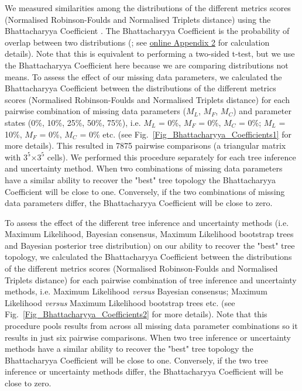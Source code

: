 \documentclass[12pt,letterpaper]{article}
\begin{document}
We measured similarities among the distributions of the different metrics scores (Normalised Robinson-Foulds and Normalised Triplets distance) using the Bhattacharyya Coefficient \citep{Bhattacharyya}. The Bhattacharyya Coefficient is the probability of overlap between two distributions (\citealt{Bhattacharyya}; see \hyperref[SupplementaryMaterial]{online Appendix 2} for calculation details). Note that this is equivalent to performing a two-sided t-test, but we use the Bhattacharyya Coefficient here because we are comparing distributions not means. To assess the effect of our missing data parameters, we calculated the Bhattacharyya Coefficient between the distributions of the different metrics scores (Normalised Robinson-Foulds and Normalised Triplets distance) for each pairwise combination of missing data parameters ($M_{L}$, $M_{F}$, $M_{C}$) and parameter states (0\%, 10\%, 25\%, 50\%, 75\%), i.e. $M_{L}$ = 0\%, $M_{F}$ = 0\%, $M_{C}$ = 0\%; $M_{L}$ = 10\%, $M_{F}$ = 0\%, $M_{C}$ = 0\% etc. (see Fig.~\ref{Fig_Bhattacharyya_Coefficients1} for more details). This resulted in 7875 pairwise comparisons (a triangular matrix with $3^5$$\times$$3^5$ cells). We performed this procedure separately for each tree inference and uncertainty method. When two combinations of missing data parameters have a similar ability to recover the "best" tree topology the Bhattacharyya Coefficient will be close to one. Conversely, if the two combinations of missing data parameters differ, the Bhattacharyya Coefficient will be close to zero.

To assess the effect of the different tree inference and uncertainty methods (i.e. Maximum Likelihood, Bayesian consensus, Maximum Likelihood bootstrap trees and Bayesian posterior tree distribution) on our ability to recover the "best" tree topology, we calculated the Bhattacharyya Coefficient between the distributions of the different metrics scores (Normalised Robinson-Foulds and Normalised Triplets distance) for each pairwise combination of tree inference and uncertainty methods, i.e. Maximum Likelihood \textit{versus} Bayesian consensus; Maximum Likelihood \textit{versus} Maximum Likelihood bootstrap trees etc. (see Fig.~\ref{Fig_Bhattacharyya_Coefficients2} for more details). Note that this procedure pools results from across all missing data parameter combinations so it results in just six pairwise comparisons. When two tree inference or uncertainty methods have a similar ability to recover the "best" tree topology the Bhattacharyya Coefficient will be close to one. Conversely, if the two tree inference or uncertainty methods differ, the Bhattacharyya Coefficient will be close to zero.
\end{document}

